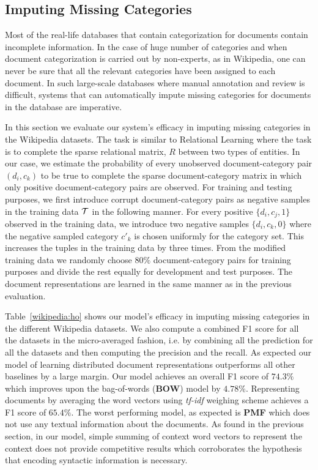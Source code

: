 \subsection{Imputing Missing Categories}
\label{sec:results:imputing}
Most of the real-life databases that contain categorization for documents contain incomplete information. In the case of huge number of categories and when document categorization is carried out by non-experts, as in Wikipedia, one can never be sure that all the relevant categories have been assigned to each document. In such large-scale databases where manual annotation and review is difficult, systems that can automatically impute missing categories for documents in the database are imperative.

In this section we evaluate our system's efficacy in imputing missing categories in the Wikipedia datasets.  
The task is similar to Relational Learning where the task is to complete the sparse relational matrix, $R$ between two types of entities. 
In our case, we estimate the probability of every unobserved document-category pair $(d_{i}, c_{k})$ to be true to complete the sparse document-category matrix in which only positive document-category pairs are observed.
For training and testing purposes, we first introduce corrupt document-category pairs as negative samples in the training data $\mathcal{T}$ in the following manner. For every positive $\{ d_{i}, c_{j}, 1\}$ observed in the training data, we introduce two negative samples $\{ d_{i}, c_{k}, 0\}$ where the negative sampled category $c'_{k}$ is chosen uniformly for the category set. This increases the tuples in the training data by three times. From the modified training data we randomly choose $80\%$ document-category pairs for training purposes and divide the rest equally for development and test purposes. The document representations are learned in the same manner as in the previous evaluation.

Table~\ref{wikipedia:ho} shows our model's efficacy in imputing missing categories in the different Wikipedia datasets. We also compute a combined F1 score for all the datasets in the micro-averaged fashion, i.e. by combining all the prediction for all the datasets and then computing the precision and the recall. 
As expected our model of learning distributed document representations outperforms all other baselines by a large margin. 
Our model achieves an overall F1 score of $74.3\%$ which improves upon the bag-of-words (\textbf{BOW}) model by $4.78\%$. 
Representing documents by averaging the word vectors using \emph{tf-idf} weighing scheme achieves a F1 score of $65.4\%$. 
The worst performing model, as expected is \textbf{PMF} which does not use any textual information about the documents.
As found in the previous section, in our model, simple summing of context word vectors to represent the context does not provide competitive results which corroborates the hypothesis that encoding syntactic information is necessary. 

